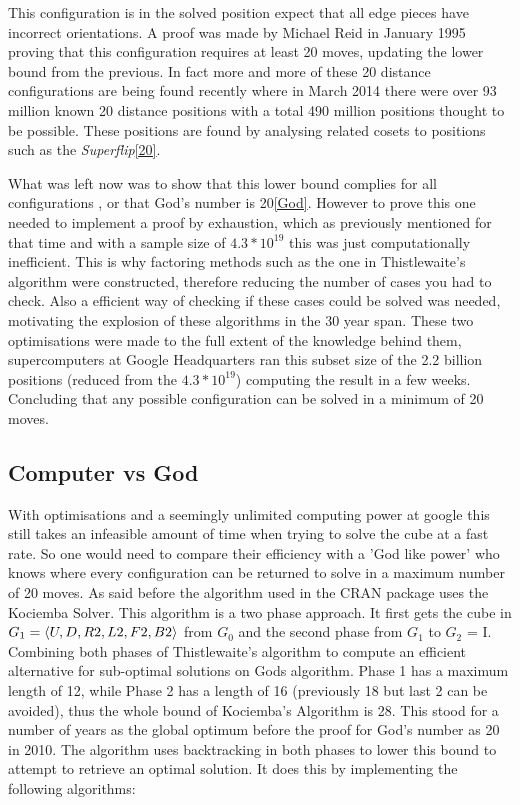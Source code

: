 \documentclass{article}
\DeclarePairedDelimiter{\opair}{\langle}{\rangle}
\begin{document}
\pagebreak
This configuration is in the solved position expect that all edge pieces have incorrect orientations. A proof was made by Michael Reid in January 1995 proving that this configuration requires at least 20 moves, updating the lower bound from the previous. In fact more and more of these 20 distance configurations are being found recently where in March 2014 there were over 93 million known 20 distance positions with a total 490 million positions thought to be possible. These positions are found by analysing related cosets to positions such as the \textit{Superflip}\ref{20}.

What was left now was to show that this lower bound complies for all configurations , or that God's number is 20\ref{God}.
However to prove this one needed to implement a proof by exhaustion, which as previously mentioned for that time and with a sample size of $4.3 * 10^{19}$ this was just computationally inefficient. This is why factoring methods such as the one in Thistlewaite's algorithm were constructed, therefore reducing the number of cases you had to check. Also a efficient way of checking if these cases could be solved was needed, motivating the explosion of these algorithms in the 30 year span.
These two optimisations were made to the full extent of the knowledge behind them, supercomputers at Google Headquarters ran this subset size of the 2.2 billion positions (reduced from the $4.3*10^{19}$) computing the result in a few weeks. Concluding that any possible configuration can be solved in a minimum of 20 moves. 
\newpage
\subsection{Computer vs God}

With optimisations and a seemingly unlimited computing power at google this still takes an infeasible amount of time when trying to solve the cube at a fast rate. So one would need to compare their efficiency with a 'God like power' who knows where every configuration can be returned to solve in a maximum number of 20 moves. As said before the algorithm used in the CRAN package uses the Kociemba Solver. This algorithm is a two phase approach. It first gets the cube in  $G_1 = \opair{U,D,R2,L2,F2,B2}$ from  $G_0$ and the second phase from $G_1$ to $G_2$ = I.  Combining both phases of Thistlewaite's algorithm to compute an efficient alternative for sub-optimal solutions on Gods algorithm. Phase 1 has a maximum length of 12, while Phase 2 has a length of 16 (previously 18 but last 2 can be avoided), thus the whole bound of Kociemba's Algorithm is 28. This stood for a number of years as the global optimum before the proof for God's number as 20 in 2010\cite{Kociemba}. The algorithm uses backtracking in both phases to lower this bound to attempt to retrieve an optimal solution. It does this by implementing the following algorithms:
\end{document}
